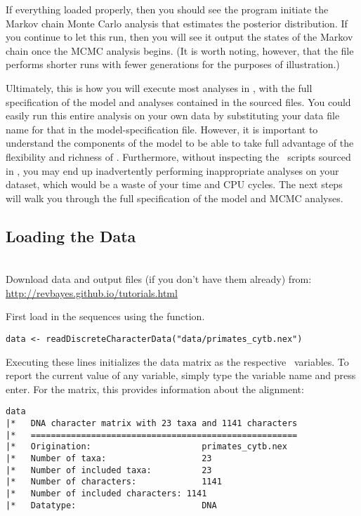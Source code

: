 If everything loaded properly, then you should see the program initiate the Markov chain Monte Carlo analysis that estimates the posterior distribution. 
If you continue to let this run, then you will see it output the states of the Markov chain once the MCMC analysis begins. 
(It is worth noting, however, that the file  performs shorter runs with fewer generations for the purposes of illustration.)

Ultimately, this is how you will execute most analyses in \RevBayes, with the full specification of the model and analyses contained in the sourced files. 
You could easily run this entire analysis on your own data by substituting your data file name for that in the model-specification file. 
However, it is important to understand the components of the model to be able to take full advantage of the flexibility and richness of \RevBayes.
Furthermore, without inspecting the \Rev~scripts sourced in , you may end up inadvertently performing inappropriate analyses on your dataset, which would be a waste of your time and CPU cycles. 
The next steps will walk you through the full specification of the model and MCMC analyses. 

\bigskip

\subsection{Loading the Data}

\noindent \\ \impmark Download data and output files (if you don't have them already) from: \href{http://revbayes.github.io/tutorials.html}{http://revbayes.github.io/tutorials.html}


First load in the sequences using the  function. 
{\tt \begin{snugshade*}
\begin{lstlisting}
data <- readDiscreteCharacterData("data/primates_cytb.nex")
\end{lstlisting}
\end{snugshade*}}
Executing these lines initializes the data matrix as the respective \Rev~variables. 
To report the current value of any variable, simply type the variable name and press enter. For the  matrix, this provides information about the alignment:
{\tt \begin{snugshade*}
\begin{lstlisting}
data
|*   DNA character matrix with 23 taxa and 1141 characters
|*   =====================================================
|*   Origination:                      primates_cytb.nex
|*   Number of taxa:                   23
|*   Number of included taxa:          23
|*   Number of characters:             1141
|*   Number of included characters: 1141
|*   Datatype:                         DNA
\end{lstlisting}
\end{snugshade*}}



